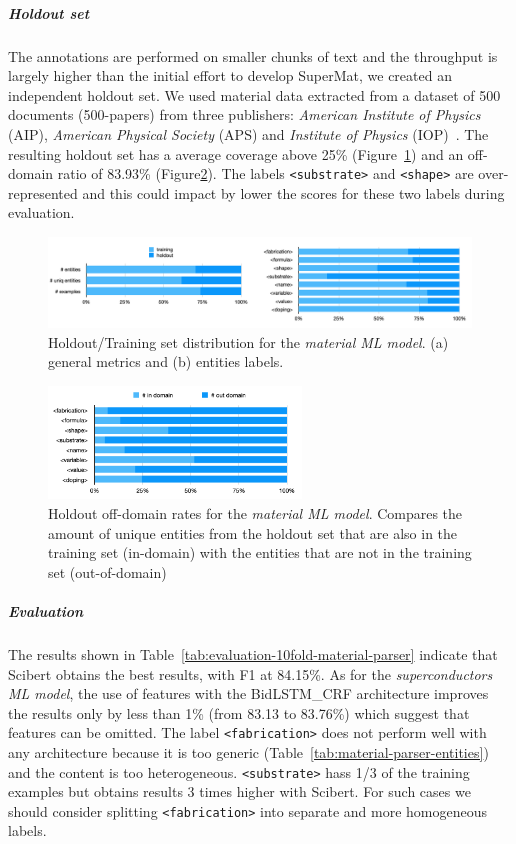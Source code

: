 \documentclass{article}
\begin{document}
\subparagraph{Holdout set}
The annotations are performed on smaller chunks of text and the throughput is largely higher than the initial effort to develop SuperMat, we created an independent holdout set. 
We used material data extracted from a dataset of 500 documents (500-papers) from three publishers: \textit{American Institute of Physics} (AIP), \textit{American Physical Society} (APS) and \textit{Institute of Physics} (IOP)~\cite{foppiano2019proposal}.
The resulting holdout set has a average coverage above 25\% (Figure~\ref{fig:material-training-holdout-set-distribution}) and an off-domain ratio of 83.93\% (Figure\ref{fig:material-out-domain-holdout}). 
The labels \texttt{<substrate>} and \texttt{<shape>} are over-represented and this could impact by lower the scores for these two labels during evaluation. 


\begin{figure}[ht]
\centering
\includegraphics[width=\textwidth]{material-holdout-training-set}
\caption{Holdout/Training set distribution for the \textit{material ML model}. (a) general metrics and (b) entities labels.}
\label{fig:material-training-holdout-set-distribution}
\end{figure}

\begin{figure}[ht]
\centering
\includegraphics[width=0.6\textwidth]{material-out-domain-holdout-unique}
\caption{Holdout off-domain rates for the \textit{material ML model}. Compares the amount of unique entities from the holdout set that are also in the training set (in-domain) with the entities that are not in the training set (out-of-domain)}
\label{fig:material-out-domain-holdout}
\end{figure}

\subparagraph{Evaluation}

The results shown in Table~\ref{tab:evaluation-10fold-material-parser} indicate that Scibert obtains the best results, with F1 at 84.15\%.
As for the \textit{superconductors ML model}, the use of features with the BidLSTM\_CRF architecture improves the results only by less than 1\% (from 83.13 to 83.76\%) which suggest that features can be omitted. 
The label \texttt{<fabrication>} does not perform well with any architecture because it is too generic (Table~\ref{tab:material-parser-entities}) and the content is too heterogeneous. \texttt{<substrate>} hass 1/3 of the training examples but obtains results 3 times higher with Scibert. 
For such cases we should consider splitting \texttt{<fabrication>} into separate and more homogeneous labels. 
\end{document}
